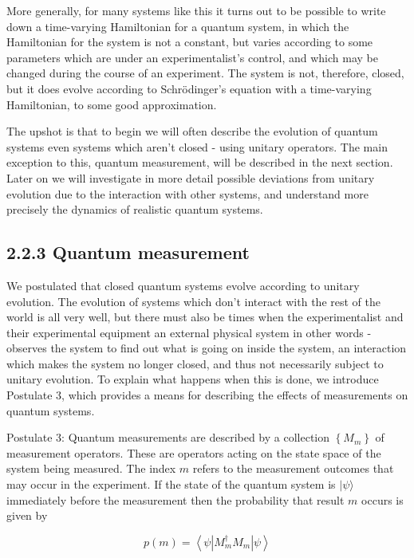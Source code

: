 \documentclass[10pt]{article}
\begin{document}
More generally, for many systems like this it turns out to be possible to write down a time-varying Hamiltonian for a quantum system, in which the Hamiltonian for the system is not a constant, but varies according to some parameters which are under an experimentalist's control, and which may be changed during the course of an experiment. The system is not, therefore, closed, but it does evolve according to Schrödinger's equation with a time-varying Hamiltonian, to some good approximation.

The upshot is that to begin we will often describe the evolution of quantum systems even systems which aren't closed - using unitary operators. The main exception to this, quantum measurement, will be described in the next section. Later on we will investigate in more detail possible deviations from unitary evolution due to the interaction with other systems, and understand more precisely the dynamics of realistic quantum systems.

\subsection*{2.2.3 Quantum measurement}
We postulated that closed quantum systems evolve according to unitary evolution. The evolution of systems which don't interact with the rest of the world is all very well, but there must also be times when the experimentalist and their experimental equipment an external physical system in other words - observes the system to find out what is going on inside the system, an interaction which makes the system no longer closed, and thus not necessarily subject to unitary evolution. To explain what happens when this is done, we introduce Postulate 3, which provides a means for describing the effects of measurements on quantum systems.

Postulate 3: Quantum measurements are described by a collection $\left\{M_{m}\right\}$ of measurement operators. These are operators acting on the state space of the system being measured. The index $m$ refers to the measurement outcomes that may occur in the experiment. If the state of the quantum system is $|\psi\rangle$ immediately before the measurement then the probability that result $m$ occurs is\\
given by


\begin{equation*}
p(m)=\left\langle\psi\left|M_{m}^{\dagger} M_{m}\right| \psi\right\rangle \tag{2.92}
\end{equation*}
\end{document}
